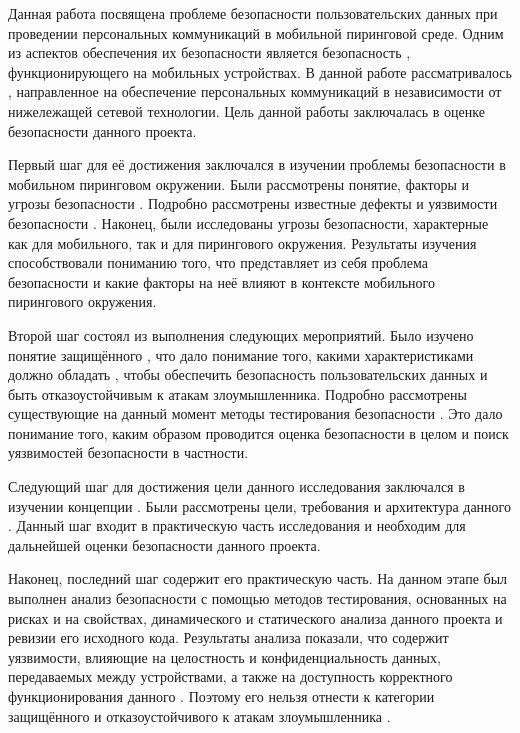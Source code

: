 %
%
Данная работа посвящена проблеме безопасности пользовательских данных при проведении персональных коммуникаций в мобильной пиринговой среде. 
%
Одним из аспектов обеспечения их безопасности является безопасность , функционирующего на мобильных устройствах. 
%
В данной работе рассматривалось  , направленное на обеспечение персональных коммуникаций в независимости от нижележащей сетевой технологии. 
%
Цель данной работы заключалась в оценке безопасности данного проекта. 

%
Первый шаг для её достижения заключался в изучении проблемы безопасности  в мобильном пиринговом окружении. 
%
Были рассмотрены понятие, факторы и угрозы безопасности . 
%
Подробно рассмотрены известные дефекты и уязвимости безопасности . 
%
Наконец, были исследованы угрозы безопасности, характерные как для мобильного, так и для пирингового окружения. 
%
Результаты изучения способствовали пониманию того, что представляет из себя проблема безопасности  и какие факторы на неё влияют в контексте мобильного пирингового окружения. 

%
Второй шаг состоял из выполнения следующих мероприятий. 
%
Было изучено понятие защищённого , что дало понимание того, какими характеристиками должно обладать , чтобы обеспечить безопасность пользовательских данных и быть отказоустойчивым к атакам злоумышленника. 
%
Подробно рассмотрены существующие на данный момент методы тестирования безопасности . 
%
Это дало понимание того, каким образом проводится оценка безопасности  в целом и поиск уязвимостей безопасности в частности. 

%
Следующий шаг для достижения цели данного исследования заключался в изучении концепции . 
%
Были рассмотрены цели, требования и архитектура данного . 
%
Данный шаг входит в практическую часть исследования и необходим для дальнейшей оценки безопасности данного проекта. 

%
Наконец, последний шаг содержит его практическую часть. 
%
На данном этапе был выполнен анализ безопасности  с помощью методов тестирования, основанных на рисках и на свойствах, динамического и статического анализа данного проекта и ревизии его исходного кода. 
%
Результаты анализа показали, что  содержит уязвимости, влияющие на целостность и конфиденциальность данных, передаваемых между устройствами, а также на доступность корректного функционирования данного . 
%
Поэтому его нельзя отнести к категории защищённого и отказоустойчивого к атакам злоумышленника . 

